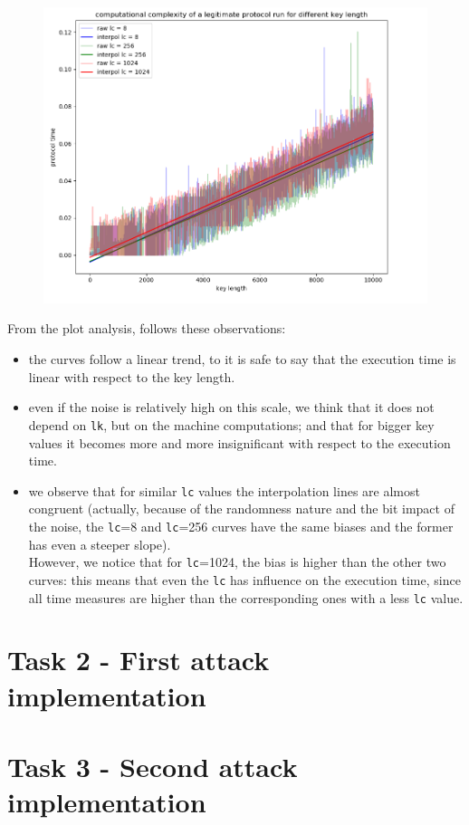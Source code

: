 \documentclass{report}
\begin{document}
\begin{figure}[H]
\centering
\includegraphics[width=1\textwidth]{plot1}
\end{figure}	

From the plot analysis, follows these observations:
\begin{itemize}

\item the curves follow a linear trend, to it is safe to say that the execution time is linear with respect to the key length.

\item even if the noise is relatively high on this scale, we think that it does not depend on {\tt lk}, but on the machine computations; and that for bigger key values it becomes more and more insignificant with respect to the execution time. 

\item  we observe that for similar {\tt lc} values the interpolation lines are almost congruent (actually, because of the randomness nature and the bit impact of the noise, the {\tt lc}=8 and {\tt lc}=256 curves have the same biases and the former has even a steeper slope).\\
However, we notice that for {\tt lc}=1024, the bias is higher than the other two curves: this means that even the {\tt lc} has influence on the execution time, since all time measures are higher than the corresponding ones with a less {\tt lc} value. 

\end{itemize}
 
 
 
 
 
 
 
 




\section*{Task 2 - First attack implementation}





\section*{Task 3 - Second attack implementation}
\end{document}
